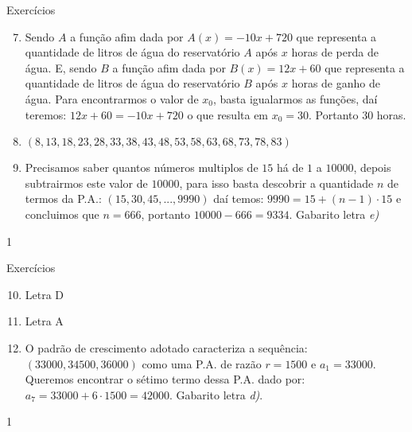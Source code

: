 \clearmargin
\begin{answer}{Exercícios}
{\exerciselist
\begin{enumerate}\setcounter{enumi}{6}
\item   Sendo $A$ a função afim dada por $A(x)=-10x+720$ que representa a quantidade de litros de água do reservatório $A$ após $x$ horas de perda de água. E, sendo $B$ a função afim dada por $B(x)=12x+60$ que representa a quantidade de litros de água do reservatório $B$ após $x$ horas de ganho de água. Para encontrarmos o valor de $x_0$, basta igualarmos as funções, daí teremos: $12x+60=−10x+720$ o que resulta em $x_0=30$. Portanto 30 horas.

\item  $(8,13,18,23,28,33,38,43,48,53,58,63,68,73,78,83)$ 

\item  Precisamos saber quantos números multiplos de $15$ há de $1$ a $10000$, depois subtrairmos este valor de $10000$, para isso basta descobrir a quantidade $n$ de termos da P.A.: $(15,30,45,...,9990)$ daí temos: $9990=15+(n-1)\cdot15$ e concluimos que $n=666$, portanto $10000-666=9334$. Gabarito letra \textit{e)}

\end{enumerate}
}{1}
\end{answer}
\clearmargin
\begin{answer}{Exercícios}
{\exerciselist
\begin{enumerate}\setcounter{enumi}{9}
\item Letra D %
\item Letra A %
\item  O padrão de crescimento adotado caracteriza a sequência: $(33000,34500,36000)$ como uma P.A. de razão $r=1500$ e $a_1=33000$. Queremos encontrar o sétimo termo dessa P.A. dado por: $a_7=33000+6\cdot1500=42000$. Gabarito letra \textit{d)}.
\end{enumerate}
}{1}
\end{answer}
\clearmargin
